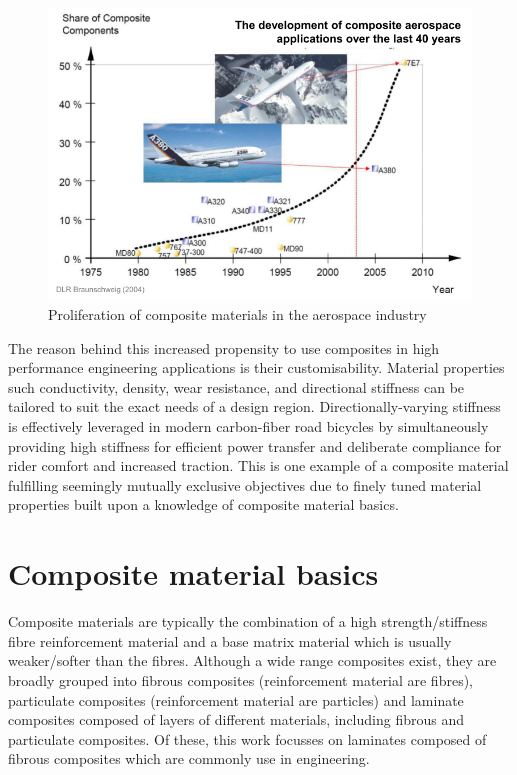 \begin{figure}[H]
	\centering
	\def\svgwidth{\columnwidth}
	\includegraphics[width=12cm]{images/composites_aerospace.png}
	\caption{Proliferation of composite materials in the aerospace industry  \cite{BischLitBook04}}
	\label{composite_aerospace}
\end{figure}

The reason behind this increased propensity to use composites in high performance engineering applications is their customisability. Material properties such conductivity, density, wear resistance, and directional stiffness can be tailored to suit the exact needs of a design region. Directionally-varying stiffness is effectively leveraged in modern carbon-fiber road bicycles by simultaneously providing high stiffness for efficient power transfer and deliberate compliance for rider comfort and increased traction. This is one example of a composite material fulfilling seemingly mutually exclusive objectives due to finely tuned material properties built upon a knowledge of composite material basics.

\section{Composite material basics}

Composite materials are typically the combination of a high strength/stiffness fibre reinforcement material and a base matrix material which is usually weaker/softer than the fibres. Although a wide range composites exist, they are broadly grouped into fibrous composites (reinforcement material are fibres), particulate composites (reinforcement material are particles) and laminate composites composed of layers of different materials, including fibrous and particulate composites. Of these, this work focusses on laminates composed of fibrous composites which are commonly use in engineering.

